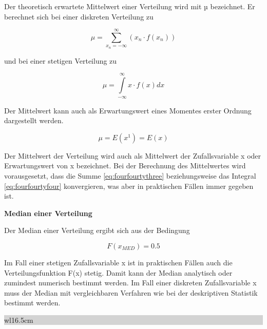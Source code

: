 \noindent Der theoretisch erwartete Mittelwert einer Verteilung wird mit µ bezeichnet. Er berechnet sich bei einer diskreten Verteilung zu

\begin{equation}\label{eq:fourfourtythree}
\mu =\sum _{x_{n} =-\infty }^{\infty }\left(x_{n} \cdot f\left(x_{n} \right)\right)
\end{equation}

\noindent und bei einer stetigen Verteilung zu

\begin{equation}\label{eq:fourfourtyfour}
\mu =\int\limits _{-\infty }^{\infty }x\cdot f(x)dx
\end{equation}

\noindent Der Mittelwert kann auch als Erwartungswert eines Momentes erster Ordnung dargestellt werden. 

\begin{equation}\label{eq:fourfourtyfive}
\mu =E(x^{1})=E(x)
\end{equation}

\noindent Der Mittelwert der Verteilung wird auch als Mittelwert der Zufallsvariable x oder Erwartungswert von x bezeichnet. Bei der Berechnung des Mittelwertes wird vorausgesetzt, dass die Summe \eqref{eq:fourfourtythree} beziehungsweise das Integral \eqref{eq:fourfourtyfour} konvergieren, was aber in praktischen F\"{a}llen immer gegeben ist.\bigskip

{\selectfont
\noindent\textbf{Median einer Verteilung}}\smallskip

\noindent Der Median einer Verteilung ergibt sich aus der Bedingung

\begin{equation}\label{eq:fourfourtysix}
F\left(x_{MED} \right)=0.5
\end{equation}

\noindent Im Fall einer stetigen Zufallsvariable x ist in praktischen F\"{a}llen auch die Verteilungsfunktion F(x) stetig. Damit kann der Median analytisch oder zumindest numerisch bestimmt werden. Im Fall einer diskreten Zufallsvariable x muss der Median mit vergleichbaren Verfahren wie bei der deskriptiven Statistik bestimmt werden.

\clearpage

\noindent
\colorbox{lightgray}{%
%
\renewcommand\arraystretch{0.6}%
\begin{tabular}{ wl{16.5cm} }
{}
\end{tabular}%
}\medskip  


